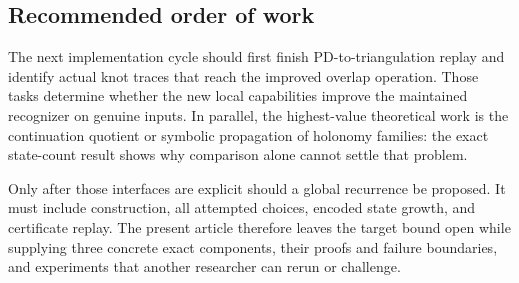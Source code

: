 \subsection{Recommended order of work}

The next implementation cycle should first finish PD-to-triangulation replay
and identify actual knot traces that reach the improved overlap operation.
Those tasks determine whether the new local capabilities improve the
maintained recognizer on genuine inputs. In parallel, the highest-value
theoretical work is the continuation quotient or symbolic propagation of
holonomy families: the exact state-count result shows why comparison alone
cannot settle that problem.

Only after those interfaces are explicit should a global recurrence be
proposed. It must include construction, all attempted choices, encoded
state growth, and certificate replay. The present article therefore leaves
the target bound open while supplying three concrete exact components,
their proofs and failure boundaries, and experiments that another researcher
can rerun or challenge.
